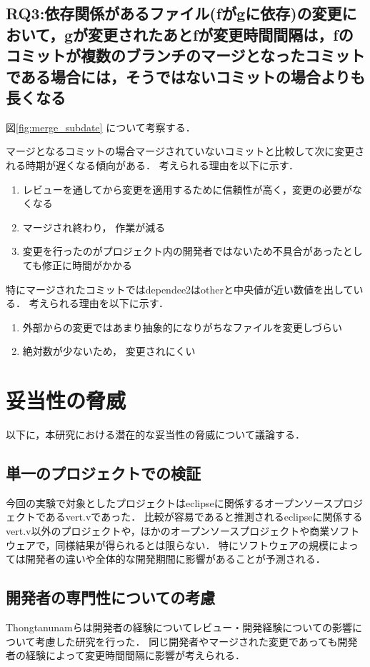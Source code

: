 \documentclass{fose2016}           %
\begin{document}
\subsection{RQ3:依存関係があるファイル(fがgに依存)の変更において，gが変更されたあとfが変更時間間隔は，fのコミットが複数のブランチのマージとなったコミットである場合には，そうではないコミットの場合よりも長くなる}
図\ref{fig:merge_subdate} について考察する．

マージとなるコミットの場合マージされていないコミットと比較して次に変更される時期が遅くなる傾向がある．
考えられる理由を以下に示す．
\begin{enumerate}
\item レビューを通してから変更を適用するために信頼性が高く，変更の必要がなくなる
\item マージされ終わり， 作業が減る
\item 変更を行ったのがプロジェクト内の開発者ではないため不具合があったとしても修正に時間がかかる
\end{enumerate}

特にマージされたコミットではdependee2はotherと中央値が近い数値を出している．
考えられる理由を以下に示す．
\begin{enumerate}
\item 外部からの変更ではあまり抽象的になりがちなファイルを変更しづらい
\item 絶対数が少ないため， 変更されにくい
\end{enumerate}

\section{妥当性の脅威}\label{妥当性の検証}
以下に，本研究における潜在的な妥当性の脅威について議論する．

\subsection*{単一のプロジェクトでの検証}
今回の実験で対象としたプロジェクトはeclipseに関係するオープンソースプロジェクトであるvert.vであった．
比較が容易であると推測されるeclipseに関係するvert.v以外のプロジェクトや，ほかのオープンソースプロジェクトや商業ソフトウェアで，同様結果が得られるとは限らない．
特にソフトウェアの規模によっては開発者の違いや全体的な開発期間に影響があることが予測される．

\subsection*{開発者の専門性についての考慮}
Thongtanunamらは開発者の経験についてレビュー・開発経験についての影響について考慮した研究を行った\cite{Thongtanunam2}．
同じ開発者やマージされた変更であっても開発者の経験によって変更時間間隔に影響が考えられる．
\end{document}
